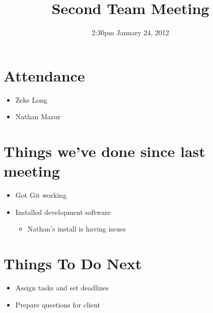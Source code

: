 \documentclass{article}
\begin{document}
\title{Second Team Meeting}
\date{2:30pm January 24, 2012}
\maketitle

\section{Attendance}
\begin{itemize}
\item Zeke Long
\item Nathan Mazur
\end{itemize}

\section{Things we've done since last meeting}
\begin{itemize}
\item Got Git working
\item Installed development software
	\begin{itemize}
	\item Nathan's install is having issues
	\end{itemize}
\end{itemize}

\section{Things To Do Next}
\begin{itemize}
\item Assign tasks and set deadlines
\item Prepare questions for client
\end{itemize}
\end{document}
